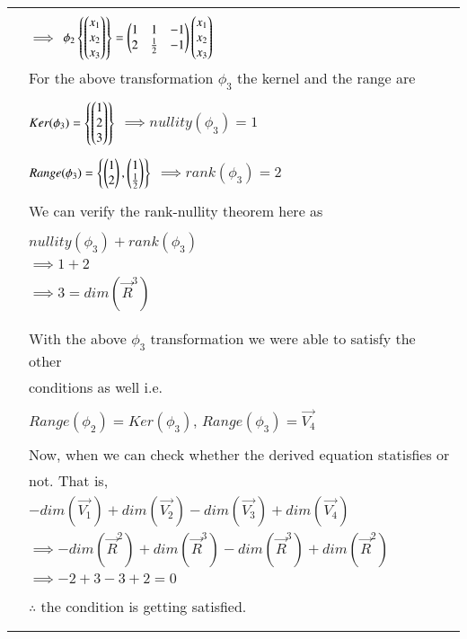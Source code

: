 \begin{longtable}{|l|l|}
		& \\
		& \qquad \qquad $\implies$ $\phi_2 \left\{ \begin{pmatrix}x_1 \\ x_2 \\ x_3\end{pmatrix}\right\} = \begin{pmatrix}1&1&-1 \\ 2&\frac{1}{2}&-1\end{pmatrix}\begin{pmatrix}x_1 \\ x_2 \\ x_3\end{pmatrix}$\\
		& For the above transformation $\phi_3$ the kernel and the range are \\
		& \\
		& \qquad \qquad $Ker(\phi_3) = \left\{\begin{pmatrix}1 \\ 2 \\ 3\end{pmatrix}\right\}$ \qquad $\implies nullity(\phi_3) = 1$\\
		& \\
		& \qquad \qquad $Range(\phi_3) = \left\{\begin{pmatrix}1 \\ 2\end{pmatrix}, \begin{pmatrix}1 \\ \frac{1}{2}\end{pmatrix}\right\}$ \qquad $\implies rank(\phi_3) = 2$\\
		& \\
		& We can verify the rank-nullity theorem here as \\
		& \\
		& \qquad \qquad \qquad $nullity(\phi_3) + rank(\phi_3)$ \\
		& \qquad \qquad $\implies 1 + 2$ \\
		& \qquad \qquad $\implies 3 = dim(\vec{R}^{3})$ \\
		& \\
		& \\
		& With the above $\phi_3$ transformation we were able to satisfy the other \\
		& conditions as well i.e.\\
		& \\
		& \qquad \qquad \qquad  $Range(\phi_2) = Ker(\phi_3)$, $Range(\phi_3) = \vec{V_4}$\\
		& \\
		& Now, when we can check whether the derived equation statisfies or \\
		& not. That is, \\
		& \qquad \qquad \qquad $- dim(\vec{V_1}) + dim(\vec{V_2}) - dim(\vec{V_3}) + dim(\vec{V_4}) $ \\
		& \qquad \qquad $\implies - dim(\vec{R}^{2}) + dim(\vec{R}^{3}) - dim(\vec{R}^{3}) + dim(\vec{R}^{2}) $ \\
		& \qquad \qquad $\implies - 2 + 3 - 3 + 2  = 0$ \\
		& \\
		& $\therefore$ the condition is getting satisfied.\\
		& \\
		\hline
\caption{}
\label{eq:solutions/2015/june/77/table:solutions}
	\end{longtable}
		
\twocolumn

